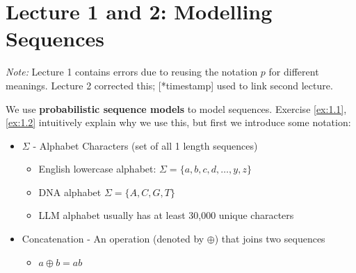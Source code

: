 \documentclass[12pt, twoside]{article}
\theoremstyle{spaceddefn}
\begin{document}
\thispagestyle{RemoveHeader}

\section*{Lecture 1 and 2: Modelling Sequences}

\textit{Note:} Lecture 1 contains errors due to reusing the notation $p$ for different meanings. Lecture 2 corrected this; [*timestamp] used to link second lecture.


We use \textbf{probabilistic sequence models} to model sequences. Exercise \ref{ex:1.1}, \ref{ex:1.2} intuitively explain why we use this, but first we introduce some notation:

\begin{itemize}
    \item $\Sigma$ - Alphabet Characters (set of all 1 length sequences)
    \begin{itemize}
        \item English lowercase alphabet: $\Sigma=\{a, b, c, d, \dots, y, z\}$
        \item DNA alphabet $\Sigma = \{A,C,G,T\}$
        \item LLM alphabet usually has at least 30,000 unique characters
    \end{itemize}

     \item Concatenation - An operation (denoted by $\oplus$) that joins two sequences
     \begin{itemize}
        \item $a\oplus b=ab$
    \end{itemize}
\end{itemize}
\end{document}

